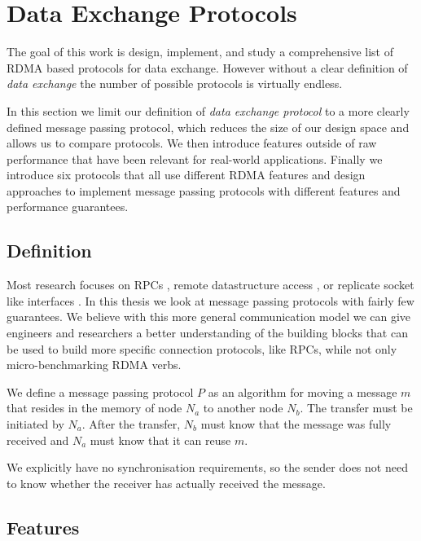 \section{Data Exchange Protocols}\label{sec:protocols}
The goal of this work is design, implement, and study a comprehensive list of RDMA based protocols for data exchange. 
However without a clear definition of \emph{data exchange} the number of possible protocols is virtually endless.

In this section we limit our definition of \emph{data exchange protocol} to a more clearly defined message passing
protocol, which reduces the size of our design space and allows us to compare protocols. We then introduce
features outside of raw performance that have been relevant for real-world applications. Finally we introduce six 
protocols that all use different RDMA features and design approaches to implement message passing protocols with different 
features and performance guarantees.

\subsection{Definition}\label{sec:proto-def}

Most research focuses on RPCs \cite{anuj-guide, fasst, herd}, remote datastructure access \cite{pilaf, farm}, or replicate 
socket like interfaces \cite{socksdirect}. In this thesis we look at message passing protocols with fairly few guarantees.
We believe with this more general communication model we can give engineers and researchers a better understanding of the 
building blocks that can be  used to build more specific connection protocols, like RPCs, while not only 
micro-benchmarking RDMA verbs.


\begin{defn}
We define a message passing protocol $P$ as an algorithm for moving a message $m$ that resides in the memory of
node $N_a$ to another node $N_b$. The transfer must be initiated by $N_a$. After the transfer, $N_b$ must know that the 
message was fully received and $N_a$ must know that it can reuse $m$.
\end{defn}

We explicitly have no synchronisation requirements, so the sender does not need to know whether the receiver has actually 
received the message.



\pagebreak

\subsection{Features}

